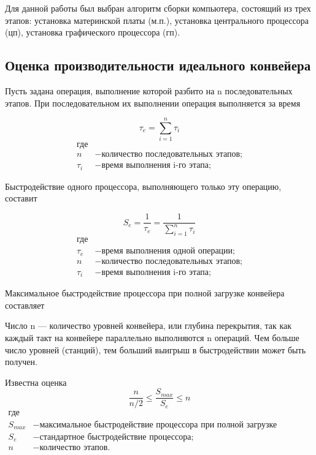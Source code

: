 Для данной работы был выбран алгоритм сборки компьютера, состоящий из трех этапов: установка материнской платы (м.п.), установка центрального процессора (цп), установка графического процессора (гп).

\subsection{Оценка производительности идеального конвейера}

Пусть задана операция, выполнение которой разбито на n последовательных этапов. При последовательном их выполнении операция выполняется за время

\begin{equation}\label{form:way} 
 \tau _{e}={\sum\limits_{i=1}^n \tau _{i}}
 \end{equation}
 \begin{align*}
    \text{где} \\
    n &- \text{количество последовательных этапов;} \\
   \tau _{i} &- \text{время выполнения i-го этапа;}
\end{align*}

Быстродействие одного процессора, выполняющего только эту операцию, составит

\begin{equation}\label{form:way} 
 S_{e}={\frac{1}{\tau _{e}}}={\frac{1}{\sum\limits_{i=1}^n \tau _{i}}}
 \end{equation}
 \begin{align*}
    \text{где} \\
    \tau _{e} &- \text{время выполнения одной операции;} \\
    n &- \text{количество последовательных этапов;} \\
   \tau _{i} &- \text{время выполнения i-го этапа;}
\end{align*}


Максимальное быстродействие процессора при полной загрузке конвейера составляет



Число n — количество уровней конвейера, или глубина перекрытия, так как каждый такт на конвейере параллельно выполняются n операций. Чем больше число уровней (станций), тем больший выигрыш в быстродействии может быть получен.

Известна оценка
\begin{equation}\label{form:way} 
{\frac{n}{n/2} \leq {\frac{S_{max}}{S_{e}}} \leq n}
 \end{equation}
 \begin{align*}
    \text{где} \\
    S_{max} &- \text{максимальное быстродействие процессора  при полной загрузке конвейера;} \\
    S_{e} &- \text{стандартное быстродействие процессора;} \\
   n &- \text{количество этапов.}
\end{align*}

